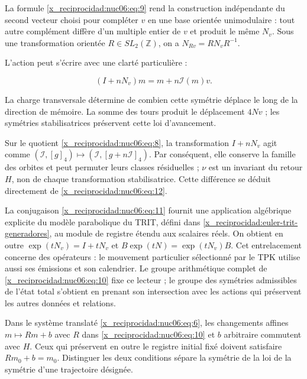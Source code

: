 La formule \eqref{x_reciprocidad:nuc06:eq:9} rend la construction indépendante du second vecteur choisi pour compléter \(v\) en une base orientée unimodulaire : tout autre complément diffère d’un multiple entier de \(v\) et produit le même \(N_v\). Sous une transformation orientée \(R\in SL_2(\mathbb Z)\), on a \(N_{Rv}=RN_vR^{-1}\).

L’action peut s’écrire avec une clarté particulière :

\begin{equation}
(I+nN_v)m=m+n\mathcal I(m)v.
\label{x_reciprocidad:nuc06:eq:12}
\end{equation}

La charge transversale détermine de combien cette symétrie déplace le long de la direction de mémoire. La somme des tours produit le déplacement \(4Nv\) ; les symétries stabilisatrices préservent cette loi d’avancement.

Sur le quotient \eqref{x_reciprocidad:nuc06:eq:8}, la transformation \(I+nN_v\) agit comme \((\mathcal I,[g]_4)\mapsto(\mathcal I,[g+n\mathcal I]_4)\). Par conséquent, elle conserve la famille des orbites et peut permuter leurs classes résiduelles ; \(\nu\) est un invariant du retour \(H\), non de chaque transformation stabilisatrice. Cette différence se déduit directement de \eqref{x_reciprocidad:nuc06:eq:12}.


La conjugaison \eqref{x_reciprocidad:nuc06:eq:11} fournit une application algébrique explicite du modèle parabolique du TRIT, défini dans \cref{x_reciprocidad:euler-trit-generadores}, au module de registre étendu aux scalaires réels. On obtient en outre \(\exp(tN_v)=I+tN_v\) et \(B\exp(tN)=\exp(tN_v)B\). Cet entrelacement concerne des opérateurs : le mouvement particulier sélectionné par le TPK utilise aussi ses émissions et son calendrier. Le groupe arithmétique complet de \eqref{x_reciprocidad:nuc06:eq:10} fixe ce lecteur ; le groupe des symétries admissibles de l’état total s’obtient en prenant son intersection avec les actions qui préservent les autres données et relations.

Dans le système translaté \eqref{x_reciprocidad:nuc06:eq:6}, les changements affines \(m\mapsto Rm+b\) avec \(R\) dans \eqref{x_reciprocidad:nuc06:eq:10} et \(b\) arbitraire commutent avec \(H\). Ceux qui préservent en outre le registre initial fixé doivent satisfaire \(Rm_0+b=m_0\). Distinguer les deux conditions sépare la symétrie de la loi de la symétrie d’une trajectoire désignée.

